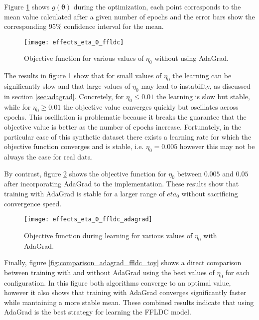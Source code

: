Figure \ref{fig:effects_eta_0} shows $g(\boldsymbol{\theta})$ during the optimization, each point corresponds to the mean value calculated after a given number of epochs and the error bars show the corresponding 95\% confidence interval for the mean.

\begin{figure}
  \centering
  \texttt{[image: effects\_eta\_0\_ffldc]}
  \caption{Objective function for various values of $\eta_0$ without using AdaGrad.}
  \label{fig:effects_eta_0}
\end{figure}

The results in figure \ref{fig:effects_eta_0} show that for small values of $\eta_0$ the learning can be significantly slow and that large values of $\eta_0$ may lead to instability, as discussed in section \ref{sec:adagrad}. Concretely, for $\eta_{0} \leq 0.01$ the learning is slow but stable, while for $\eta_{0} \geq 0.01$ the objective value converges quickly but oscillates across epochs. This oscillation is problematic because it breaks the guarantee that the objective value is better as the number of epochs increase. Fortunately, in the particular case of this synthetic dataset there exists a learning rate for which the objective function converges and is stable, i.e. $\eta_{0} = 0.005$ however this may not be always the case for real data.

By contrast, figure \ref{fig:effects_adagrad} shows the objective function for $\eta_{0}$ between $0.005$ and $0.05$ after incorporating AdaGrad to the implementation. These results show that training with AdaGrad is stable for a larger range of $eta_0$ without sacrificing convergence speed.

\begin{figure}
  \centering
  \texttt{[image: effects\_eta\_0\_ffldc\_adagrad]}
  \caption{Objective function during learning for various values of $\eta_0$ with AdaGrad.}
  \label{fig:effects_adagrad}
\end{figure}

Finally, figure \ref{fig:comparison_adagrad_ffldc_toy} shows a direct comparison between training with and without AdaGrad using the best values of $\eta_0$ for each configuration. In this figure both algorithms converge to an optimal value, however it also shows that training with AdaGrad converges significantly faster while mantaining a more stable mean. These combined results indicate that using AdaGrad is the best strategy for learning the FFLDC model.

